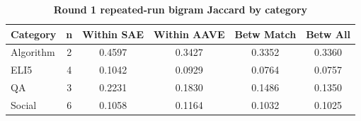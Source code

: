 \begin{table}[htbp]
\centering
\caption{\textbf{Round 1 repeated-run bigram Jaccard by category}}
\label{tab:round1-repeated-bigram-by-category}
\renewcommand{\arraystretch}{1.4}
\begin{tabular}{|l|c|c|c|c|c|}
\hline
\textbf{Category} & \textbf{n} & \textbf{Within SAE} & \textbf{Within AAVE} & \textbf{Betw Match} & \textbf{Betw All} \\
\hline
Algorithm & 2 & 0.4597 & 0.3427 & 0.3352 & 0.3360 \\
\hline
ELI5 & 4 & 0.1042 & 0.0929 & 0.0764 & 0.0757 \\
\hline
QA & 3 & 0.2231 & 0.1830 & 0.1486 & 0.1350 \\
\hline
Social & 6 & 0.1058 & 0.1164 & 0.1032 & 0.1025 \\
\hline
\end{tabular}
\end{table}
